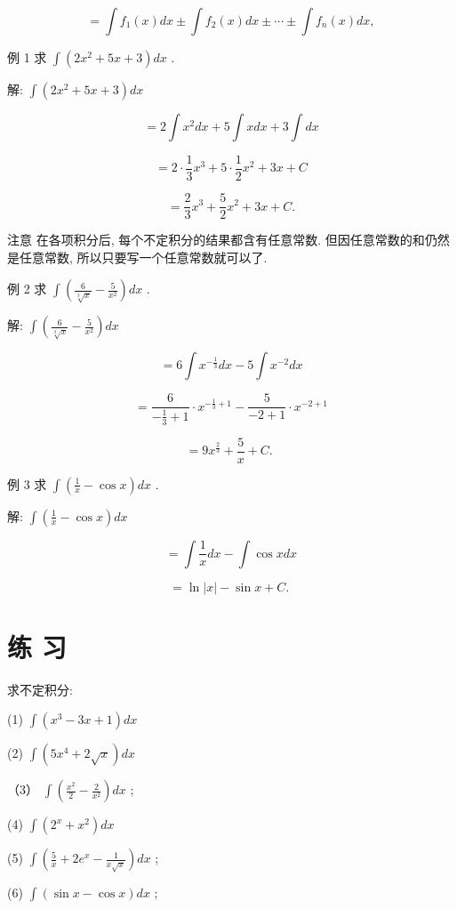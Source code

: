\documentclass[10pt]{article}
\begin{document}
\[
= \int {f}_{1}\left( x\right) {dx} \pm \int {f}_{2}\left( x\right) {dx} \pm \cdots \pm \int {f}_{n}\left( x\right) {dx},
\]

例 1 求 \(\int \left( {2{x}^{2} + {5x} + 3}\right) {dx}\) .

解: \(\int \left( {2{x}^{2} + {5x} + 3}\right) {dx}\)

\[
= 2\int {x}^{2}{dx} + 5\int {xdx} + 3\int {dx}
\]

\[
= 2 \cdot \frac{1}{3}{x}^{3} + 5 \cdot \frac{1}{2}{x}^{2} + {3x} + C
\]

\[
= \frac{2}{3}{x}^{3} + \frac{5}{2}{x}^{2} + {3x} + C.
\]

注意 在各项积分后, 每个不定积分的结果都含有任意常数. 但因任意常数的和仍然是任意常数, 所以只要写一个任意常数就可以了.

例 2 求 \(\int \left( {\frac{6}{\sqrt[3]{x}} - \frac{5}{{x}^{2}}}\right) {dx}\) .

解: \(\int \left( {\frac{6}{\sqrt[3]{x}} - \frac{5}{{x}^{2}}}\right) {dx}\)

\[
= 6\int {x}^{-\frac{1}{3}}{dx} - 5\int {x}^{-2}{dx}
\]

\[
= \frac{6}{-\frac{1}{3} + 1} \cdot {x}^{-\frac{1}{3} + 1} - \frac{5}{-2 + 1} \cdot {x}^{-2 + 1}
\]

\[
= 9{x}^{\frac{2}{3}} + \frac{5}{x} + C\text{. }
\]

例 3 求 \(\int \left( {\frac{1}{x} - \cos x}\right) {dx}\) .

解: \(\int \left( {\frac{1}{x} - \cos x}\right) {dx}\)

\[
= \int \frac{1}{x}{dx} - \int \cos {xdx}
\]

\[
= \ln \left| x\right| - \sin x + C\text{. }
\]

\section*{练 习}

求不定积分:

(1) \(\int \left( {{x}^{3} - {3x} + 1}\right) {dx}\)

(2) \(\int \left( {5{x}^{4} + 2\sqrt{x}}\right) {dx}\)

（3） \(\int \left( {\frac{{x}^{2}}{2} - \frac{2}{{x}^{2}}}\right) {dx}\) ;

(4) \(\int \left( {{2}^{x} + {x}^{2}}\right) {dx}\)

(5) \(\int \left( {\frac{5}{x} + 2{e}^{x} - \frac{1}{x\sqrt{x}}}\right) {dx}\) ;

(6) \(\int \left( {\sin x - \cos x}\right) {dx}\) ;
\end{document}
